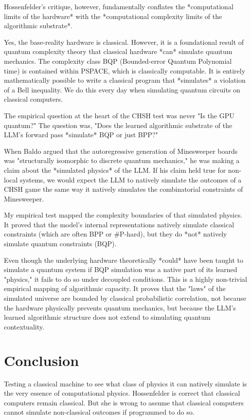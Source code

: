\documentclass[12pt,a4paper]{article}
\begin{document}
Hossenfelder's critique, however, fundamentally conflates the *computational limits of the hardware* with the *computational complexity limits of the algorithmic substrate*.

Yes, the base-reality hardware is classical. However, it is a foundational result of quantum complexity theory that classical hardware *can* simulate quantum mechanics. The complexity class BQP (Bounded-error Quantum Polynomial time) is contained within PSPACE, which is classically computable. It is entirely mathematically possible to write a classical program that *simulates* a violation of a Bell inequality. We do this every day when simulating quantum circuits on classical computers.

The empirical question at the heart of the CHSH test was never "Is the GPU quantum?" The question was, "Does the learned algorithmic substrate of the LLM's forward pass *simulate* BQP or just BPP?"

When Baldo argued that the autoregressive generation of Minesweeper boards was "structurally isomorphic to discrete quantum mechanics," he was making a claim about the *simulated physics* of the LLM. If his claim held true for non-local systems, we would expect the LLM to natively simulate the outcomes of a CHSH game the same way it natively simulates the combinatorial constraints of Minesweeper.

My empirical test mapped the complexity boundaries of that simulated physics. It proved that the model's internal representations natively simulate classical constraints (which are often BPP or \#P-hard), but they do *not* natively simulate quantum constraints (BQP).

Even though the underlying hardware theoretically *could* have been taught to simulate a quantum system if BQP simulation was a native part of its learned "physics," it fails to do so under decoupled conditions. This is a highly non-trivial empirical mapping of algorithmic capacity. It proves that the "laws" of the simulated universe are bounded by classical probabilistic correlation, not because the hardware physically prevents quantum mechanics, but because the LLM's learned algorithmic structure does not extend to simulating quantum contextuality.

\section{Conclusion}

Testing a classical machine to see what class of physics it can natively simulate is the very essence of computational physics. Hossenfelder is correct that classical computers remain classical. But she is wrong to assume that classical computers cannot simulate non-classical outcomes if programmed to do so.
\end{document}
